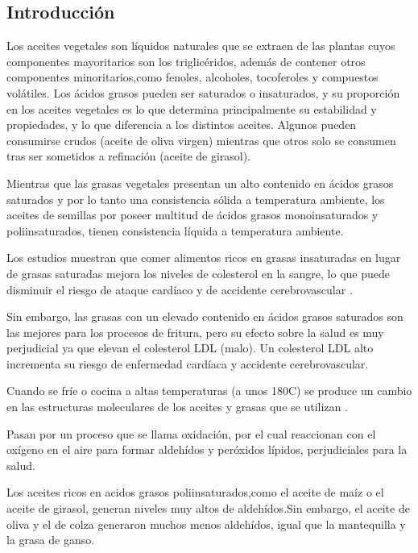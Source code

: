 \documentclass[a4paper,12pt]{article}
\begin{document}
\begin{multicols}{2}
\section{Introducción}

Los aceites vegetales son líquidos naturales que se extraen de las plantas cuyos componentes mayoritarios son los triglicéridos, además de contener otros componentes minoritarios,como fenoles, alcoholes, tocoferoles y compuestos volátiles. Los ácidos grasos pueden ser saturados o insaturados, y su proporción en los aceites vegetales es lo que determina principalmente su estabilidad y propiedades, y lo que diferencia a los distintos aceites. Algunos pueden consumirse crudos (aceite de oliva virgen) mientras que otros solo se consumen tras ser sometidos a refinación (aceite de girasol)\cite{VELASCO1999}.

Mientras que las grasas vegetales presentan un alto contenido en ácidos grasos saturados y por lo tanto una consistencia sólida a temperatura ambiente, los aceites de semillas por poseer multitud de ácidos grasos monoinsaturados y poliinsaturados, tienen consistencia líquida a temperatura ambiente.

Los estudios muestran que comer alimentos ricos en grasas insaturadas en lugar de grasas saturadas mejora los niveles de colesterol en la sangre, lo que puede disminuir el riesgo de ataque cardíaco y de accidente cerebrovascular \cite{Andarwulan2014}.

Sin embargo, las grasas con un elevado contenido en ácidos grasos saturados son las mejores para los procesos de fritura, pero su efecto sobre la salud es muy perjudicial ya que elevan el colesterol LDL (malo). Un colesterol LDL alto incrementa su riesgo de enfermedad cardíaca y accidente cerebrovascular.

Cuando se fríe o cocina a altas temperaturas (a unos 180C) se produce un cambio en las estructuras moleculares de los aceites y grasas que se utilizan \cite{Burton2022}.

Pasan por un proceso que se llama oxidación, por el cual reaccionan con el oxígeno en el aire para formar aldehídos y peróxidos lípidos, perjudiciales para la salud.

Los aceites ricos en acidos grasos poliinsaturados,como el aceite de maíz o el aceite de girasol, generan niveles muy altos de aldehídos.Sin embargo, el aceite de oliva y el de colza generaron muchos menos aldehídos, igual que la mantequilla y la grasa de ganso.


\end{multicols}
\end{document}
